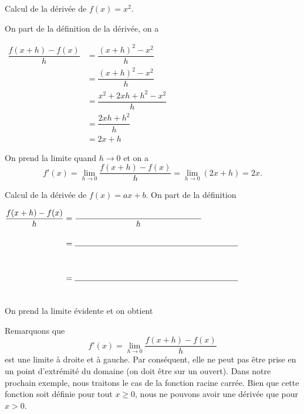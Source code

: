 \documentclass[a4paper,12pt]{article}
\begin{document}
\begin{exemple}
	\tcblower
	Calcul de la dérivée de $f(x)=x^2$. 

	On part de la définition de la dérivée, on a 

\medskip

$\begin{aligned}
	\dfrac{f(x+h) - f(x)}{h} &= \dfrac{(x+h)^2 - x^2}{h}\\
				 &=\dfrac{(x+h)^2 - x^2}{h}\\
				 &=\dfrac{x^2 + 2xh + h^2 - x^2}{h}\\
				 &= \dfrac{2xh + h^2}{h}\\ 
				 &= 2x + h
\end{aligned}$
\medskip

On prend la limite quand $h\to 0$ et on a 
\[f'(x) = \displaystyle\lim_{h \to 0} \dfrac{f(x+h) - f(x)}{h} = \lim_{h\to 0} (2x+h)=2x.\]
\end{exemple}
\begin{exemple}
	\tcblower
	Calcul de la dérivée de $f(x)=ax+b$.
	On part de la définition 
\bigskip

$\begin{aligned}
	\dfrac{f(x+h) - f(x)}{h} &= \dfrac{\phantom{aaaaaaaaaaaaaaaaaaaaaaaaaaaaa}}{h}\\
				 &=\ligne{7}\\
				 &\\
				 &=\ligne{7}\\
				 &\\
\end{aligned}
$
\medskip

On prend la limite évidente et on obtient 
\vspace{2cm}
\end{exemple}

\begin{remarque}
	\tcblower
Remarquons que $$f'(x) = \displaystyle\lim_{h \to 0} \dfrac{f(x+h) - f(x)}{h}$$
est une limite à droite et à gauche. Par conséquent, elle ne peut pas être prise en un point d'extrémité du domaine (on doit être sur un ouvert). Dans notre prochain exemple, nous traitons le cas de la fonction racine carrée. Bien que cette fonction soit définie pour tout $x \ge 0$, nous ne pouvons avoir une dérivée que pour $x > 0$.
\end{remarque}
\end{document}
